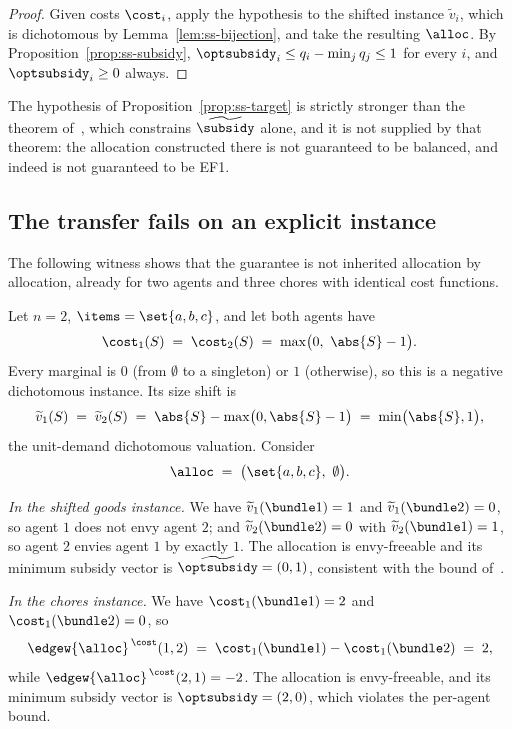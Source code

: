 \begin{proof}
Given costs $\cost_i$, apply the hypothesis to the shifted instance
$\widetilde{v}_i$, which is dichotomous by Lemma~\ref{lem:ss-bijection}, and
take the resulting $\alloc$. By Proposition~\ref{prop:ss-subsidy},
$\optsubsidy_i \le q_i - \min_j q_j \le 1$ for every $i$, and
$\optsubsidy_i \ge 0$ always.
\end{proof}

The hypothesis of Proposition~\ref{prop:ss-target} is strictly stronger than the
theorem of~\cite{BKNS22}, which constrains $\widetilde{\subsidy}$ alone, and it
is not supplied by that theorem: the allocation constructed there is not
guaranteed to be balanced, and indeed is not guaranteed to be EF1.

\subsection{The transfer fails on an explicit instance}

The following witness shows that the guarantee is not inherited allocation by
allocation, already for two agents and three chores with identical cost
functions.

\begin{example}
\label{ex:ss-fail}
Let $n = 2$, $\items = \set{a,b,c}$, and let both agents have
\[
  \cost_1(S) \;=\; \cost_2(S) \;=\; \max\bigl(0,\ \abs{S}-1\bigr).
\]
Every marginal is $0$ (from $\emptyset$ to a singleton) or $1$ (otherwise), so
this is a negative dichotomous instance. Its size shift is
\[
  \widetilde{v}_1(S) \;=\; \widetilde{v}_2(S)
  \;=\; \abs{S} - \max\bigl(0,\abs{S}-1\bigr) \;=\; \min\bigl(\abs{S},1\bigr),
\]
the unit-demand dichotomous valuation. Consider
\[
  \alloc \;=\; \bigl(\set{a,b,c},\ \emptyset\bigr).
\]

\emph{In the shifted goods instance.} We have
$\widetilde{v}_1(\bundle1) = 1$ and $\widetilde{v}_1(\bundle2) = 0$, so agent
$1$ does not envy agent $2$; and $\widetilde{v}_2(\bundle2) = 0$ with
$\widetilde{v}_2(\bundle1) = 1$, so agent $2$ envies agent $1$ by exactly $1$.
The allocation is envy-freeable and its minimum subsidy vector is
$\widetilde{\optsubsidy} = (0,1)$, consistent with the bound
of~\cite{BKNS22}.

\emph{In the chores instance.} We have $\cost_1(\bundle1) = 2$ and
$\cost_1(\bundle2) = 0$, so
\[
  \edgew{\alloc}^{\,\cost}(1,2) \;=\; \cost_1(\bundle1) - \cost_1(\bundle2) \;=\; 2 ,
\]
while $\edgew{\alloc}^{\,\cost}(2,1) = -2$. The allocation is envy-freeable, and
its minimum subsidy vector is $\optsubsidy = (2,0)$, which violates the
per-agent bound.
\end{example}

